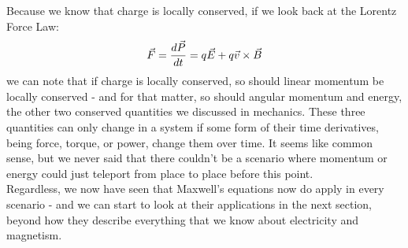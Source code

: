 Because we know that charge is locally conserved, if we look back at the Lorentz Force Law:
\[
	\vec F = \frac{d \vec P}{d t} = q\vec E + q \vec v \times \vec B
\]
we can note that if charge is locally conserved, so should linear momentum be locally conserved - and for that matter, so should angular momentum and energy, the other two conserved quantities we discussed in mechanics. These three quantities can only change in a system if some form of their time derivatives, being force, torque, or power, change them over time. It seems like common sense, but we never said that there couldn't be a scenario where momentum or energy could just teleport from place to place before this point.\\
Regardless, we now have seen that Maxwell's equations now do apply in every scenario - and we can start to look at their applications in the next section, beyond how they describe everything that we know about electricity and magnetism.
